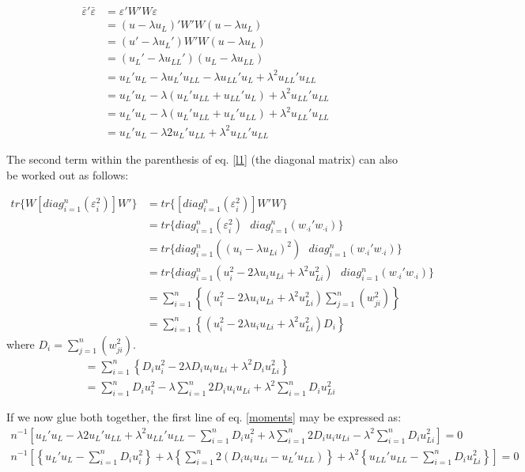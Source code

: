 \documentclass{article}
\begin{document}
\begin{align}
\bar\varepsilon'\bar\varepsilon &= \varepsilon' W'W \varepsilon \\ 
&= (u - \lambda u_L)' W'W (u - \lambda u_L) \\
&= (u' - \lambda u_L') W'W (u - \lambda u_L) \\
&= (u_L' - \lambda u_{LL}') (u_L - \lambda u_{LL}) \\
&= u_L' u_L - \lambda u_L' u_{LL} - \lambda u_{LL}' u_L + \lambda^2 u_{LL}'u_{LL} \\
&= u_L' u_L - \lambda (u_L' u_{LL} + u_{LL}' u_L) + \lambda^2 u_{LL}'u_{LL} \\
&= u_L' u_L - \lambda (u_L'u_{LL} + u_L' u_{LL}) + \lambda^2 u_{LL}'u_{LL} \\
&= u_L' u_L - \lambda 2 u_L' u_{LL} + \lambda^2 u_{LL}'u_{LL}
\end{align}


The second term within the parenthesis of eq. \ref{l1} (the diagonal matrix)
can also be worked out as follows: 

\begin{align}
tr\{W[diag_{i=1}^n(\varepsilon_i^2)]W'\} &= tr\{[diag_{i=1}^n(\varepsilon_i^2)]W'W\} \\
&= tr\{diag_{i=1}^n(\varepsilon_i^2) \mbox{  } diag_{i=1}^n(w_{\cdot i}' w_{\cdot i})\} \\
&= tr\{diag_{i=1}^n((u_i - \lambda u_{Li})^2) \mbox{  } diag_{i=1}^n(w_{\cdot i}' w_{\cdot i})\} \\
&= tr\{diag_{i=1}^n(u_i^2 - 2 \lambda u_i u_{Li} + \lambda^2 u_{Li}^2 ) \mbox{  } diag_{i=1}^n(w_{\cdot i}' w_{\cdot i})\} \\
&= \sum_{i=1}^n\left\{(u_i^2 - 2 \lambda u_i u_{Li} + \lambda^2 u_{Li}^2 ) \sum_{j=1}^n(w_{ji}^2)\right\} \\
&= \sum_{i=1}^n\left\{(u_i^2 - 2 \lambda u_i u_{Li} + \lambda^2 u_{Li}^2 ) D_i\right\} 
\end{align}
where $D_i = \sum_{j=1}^n(w_{ji}^2)$.
\begin{align}
&= \sum_{i=1}^n\left\{D_i u_i^2 - 2 \lambda D_i u_i u_{Li} + \lambda^2 D_i u_{Li}^2 \right\} \\
&= \sum_{i=1}^n D_i u_i^2 - \lambda \sum_{i=1}^n 2D_i u_i u_{Li} + \lambda^2
\sum_{i=1}^n D_i u_{Li}^2 
\end{align}


If we now glue both together, the first line of eq. \ref{moments} may be
expressed as:
\begin{align}
n^{-1} \left[
u_L' u_L - \lambda 2 u_L' u_{LL} + \lambda^2 u_{LL}'u_{LL}  -    
\sum_{i=1}^n D_i u_i^2 + \lambda \sum_{i=1}^n 2D_i u_i u_{Li} - \lambda^2
\sum_{i=1}^n D_i u_{Li}^2  
\right] = 0\\n^{-1} \left[
\left\{u_L' u_L  - \sum_{i=1}^n D_i u_i^2\right\} + \lambda
\left\{\sum_{i=1}^n 2(D_i u_i u_{Li} - u_L' u_{LL})\right\} +
\lambda^2 \left\{u_{LL}'u_{LL} - \sum_{i=1}^n D_i u_{Li}^2\right\}  
\right] = 0
\end{align}
\end{document}
